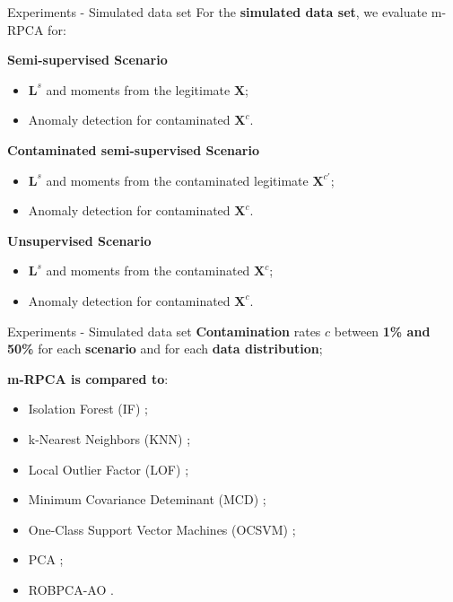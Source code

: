 \documentclass[newPxFont, numfooter, sectionpages]{beamer}
\begin{document}
\begin{frame}[c]{Experiments - Simulated data set}
    For the \textbf{simulated data set}, we evaluate m-RPCA for:
    
    \textbf{Semi-supervised Scenario}
	\begin{itemize}
		\item $\pmb{L}^s$ and moments from the legitimate $\pmb{X}$;
		\item Anomaly detection for contaminated $\pmb{X}^c$.
	\end{itemize}
    
    \textbf{Contaminated semi-supervised Scenario}
    \begin{itemize}
		\item $\pmb{L}^s$ and moments from the contaminated legitimate $\pmb{X}^{c'}$;
		\item Anomaly detection for contaminated $\pmb{X}^c$.
	\end{itemize}
    
    \textbf{Unsupervised Scenario}
    \begin{itemize}
		\item $\pmb{L}^s$ and moments from the contaminated $\pmb{X}^c$;
		\item Anomaly detection for contaminated $\pmb{X}^c$.
	\end{itemize}
\end{frame}

\begin{frame}[c]{Experiments - Simulated data set}
    \textbf{Contamination} rates $c$ between \textbf{1\% and 50\% }for each \textbf{scenario} and for each \textbf{data distribution};
    
    \textbf{m-RPCA is compared to}:
    \begin{itemize}
        \item Isolation Forest (IF) \cite{liu2008isolation};
        \item k-Nearest Neighbors (KNN) \cite{angiulli2002fast};
        \item Local Outlier Factor (LOF) \cite{breunig2000lof};
        \item Minimum Covariance Deteminant (MCD) \cite{rousseeuw1999fastmcd};
        \item One-Class Support Vector Machines (OCSVM) \cite{scholkopf2001estimating};
        \item PCA \cite{shyu2003novel};
        \item ROBPCA-AO \cite{hubert2009robustskewed}.
	\end{itemize}
\end{frame}
\end{document}
